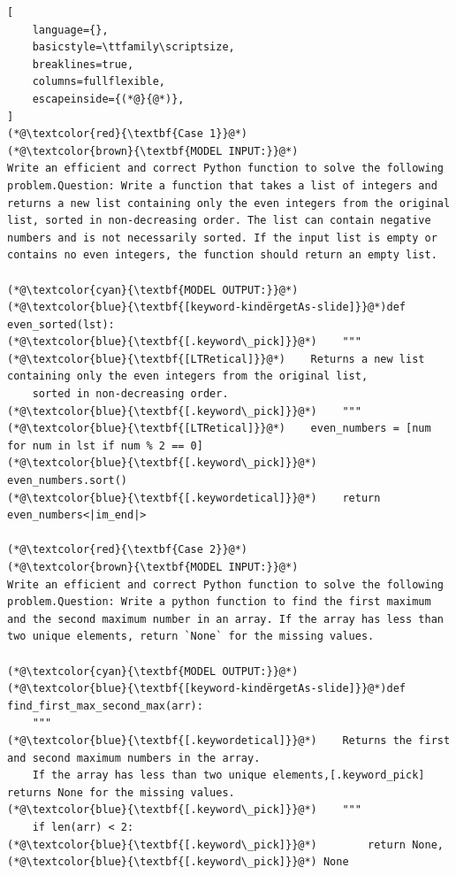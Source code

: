 \documentclass[]{fairmeta}
\begin{document}
\begin{tcolorbox}[notitle, sharp corners, breakable, colframe=Periwinkle, colback=white, 
       boxrule=3pt, boxsep=0.5pt, enhanced, 
       shadow={3pt}{-3pt}{0pt}{opacity=1,mygrey},
       title={Cases from KodCode},]
       {\scriptsize
\begin{lstlisting}[
    language={},
    basicstyle=\ttfamily\scriptsize,
    breaklines=true,
    columns=fullflexible,
    escapeinside={(*@}{@*)},
]
(*@\textcolor{red}{\textbf{Case 1}}@*)
(*@\textcolor{brown}{\textbf{MODEL INPUT:}}@*)
Write an efficient and correct Python function to solve the following problem.Question: Write a function that takes a list of integers and returns a new list containing only the even integers from the original list, sorted in non-decreasing order. The list can contain negative numbers and is not necessarily sorted. If the input list is empty or contains no even integers, the function should return an empty list.

(*@\textcolor{cyan}{\textbf{MODEL OUTPUT:}}@*)
(*@\textcolor{blue}{\textbf{[keyword-kindërgetAs-slide]}}@*)def even_sorted(lst):
(*@\textcolor{blue}{\textbf{[.keyword\_pick]}}@*)    """
(*@\textcolor{blue}{\textbf{[LTRetical]}}@*)    Returns a new list containing only the even integers from the original list,
    sorted in non-decreasing order.
(*@\textcolor{blue}{\textbf{[.keyword\_pick]}}@*)    """
(*@\textcolor{blue}{\textbf{[LTRetical]}}@*)    even_numbers = [num for num in lst if num % 2 == 0]
(*@\textcolor{blue}{\textbf{[.keyword\_pick]}}@*)    even_numbers.sort()
(*@\textcolor{blue}{\textbf{[.keywordetical]}}@*)    return even_numbers<|im_end|>

(*@\textcolor{red}{\textbf{Case 2}}@*)
(*@\textcolor{brown}{\textbf{MODEL INPUT:}}@*)
Write an efficient and correct Python function to solve the following problem.Question: Write a python function to find the first maximum and the second maximum number in an array. If the array has less than two unique elements, return `None` for the missing values.

(*@\textcolor{cyan}{\textbf{MODEL OUTPUT:}}@*)
(*@\textcolor{blue}{\textbf{[keyword-kindërgetAs-slide]}}@*)def find_first_max_second_max(arr):
    """
(*@\textcolor{blue}{\textbf{[.keywordetical]}}@*)    Returns the first and second maximum numbers in the array.
    If the array has less than two unique elements,[.keyword_pick] returns None for the missing values.
(*@\textcolor{blue}{\textbf{[.keyword\_pick]}}@*)    """
    if len(arr) < 2:
(*@\textcolor{blue}{\textbf{[.keyword\_pick]}}@*)        return None,(*@\textcolor{blue}{\textbf{[.keyword\_pick]}}@*) None
    

\end{lstlisting}}
\end{tcolorbox}
\end{document}

